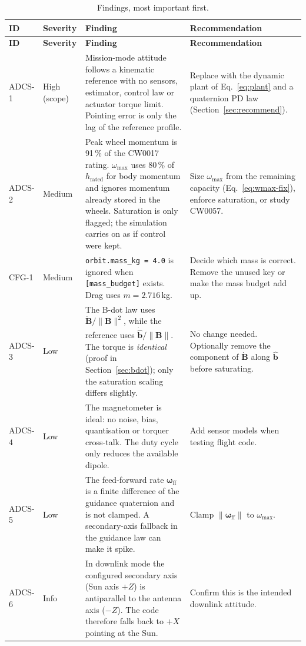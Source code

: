 \documentclass[11pt,a4paper]{article}
\newcommand{\vb}[1]{\boldsymbol{#1}}
\newcommand{\uv}[1]{\hat{\boldsymbol{#1}}}
\newcommand{\code}[1]{\texttt{#1}}
\begin{document}
\begin{longtable}{@{}L{1.3cm}L{1.6cm}L{8.2cm}L{4.4cm}@{}}
\caption{Findings, most important first.}\label{tab:findings}\\
\toprule
\textbf{ID} & \textbf{Severity} & \textbf{Finding} & \textbf{Recommendation}\\
\midrule
\endfirsthead
\toprule
\textbf{ID} & \textbf{Severity} & \textbf{Finding} & \textbf{Recommendation}\\
\midrule
\endhead
ADCS-1 & High (scope) & Mission-mode attitude follows a kinematic reference with no sensors, estimator, control law or actuator torque limit. Pointing error is only the lag of the reference profile. & Replace with the dynamic plant of Eq.~\eqref{eq:plant} and a quaternion PD law (Section~\ref{sec:recommend}).\\
ADCS-2 & Medium & Peak wheel momentum is 91\,\% of the CW0017 rating. $\omega_{\max}$ uses 80\,\% of $h_{\text{rated}}$ for body momentum and ignores momentum already stored in the wheels. Saturation is only flagged; the simulation carries on as if control were kept. & Size $\omega_{\max}$ from the remaining capacity (Eq.~\eqref{eq:wmax-fix}), enforce saturation, or study CW0057.\\
CFG-1 & Medium & \code{orbit.mass\_kg = 4.0} is ignored when \code{[mass\_budget]} exists. Drag uses $m = 2.716$\,kg. & Decide which mass is correct. Remove the unused key or make the mass budget add up.\\
ADCS-3 & Low & The B-dot law uses $\dot{\vb B}/\lVert\vb B\rVert^2$, while the reference uses $\dot{\uv b}/\lVert\vb B\rVert$. The torque is \emph{identical} (proof in Section~\ref{sec:bdot}); only the saturation scaling differs slightly. & No change needed. Optionally remove the component of $\dot{\vb B}$ along $\uv b$ before saturating.\\
ADCS-4 & Low & The magnetometer is ideal: no noise, bias, quantisation or torquer cross-talk. The duty cycle only reduces the available dipole. & Add sensor models when testing flight code.\\
ADCS-5 & Low & The feed-forward rate $\vb\omega_{\text{ff}}$ is a finite difference of the guidance quaternion and is not clamped. A secondary-axis fallback in the guidance law can make it spike. & Clamp $\lVert\vb\omega_{\text{ff}}\rVert$ to $\omega_{\max}$.\\
ADCS-6 & Info & In downlink mode the configured secondary axis (Sun axis $+Z$) is antiparallel to the antenna axis ($-Z$). The code therefore falls back to $+X$ pointing at the Sun. & Confirm this is the intended downlink attitude.\\

\end{longtable}
\end{document}
